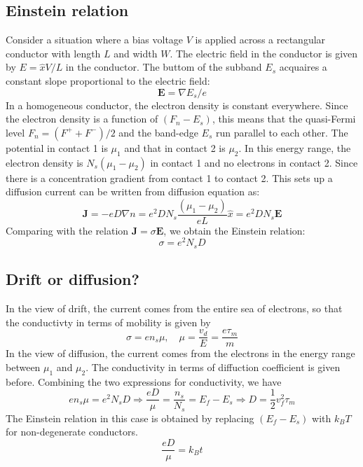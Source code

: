 \documentclass[11pt,a4paper]{book}
\theoremstyle{plain}
\theoremstyle{definition}
\theoremstyle{remark}
\renewcommand{\vec}[1]{\boldsymbol{#1}}
\begin{document}
\subsection{Einstein relation}
Consider a situation where a bias voltage $V$ is applied across a rectangular conductor with length $L$ and width $W$. The electric field in the conductor is given by $E = \hat{x}V/L$ in the conductor. The buttom of the subband $E_s$ acquaires a constant slope proportional to the electric field:
\begin{equation}
    \vec{E} = \nabla E_s/e
\end{equation}
In a homogeneous conductor, the electron density is constant everywhere. Since the electron density is a function of $(F_n-E_s)$, this means that the quasi-Fermi level $F_n = (F^+ + F^-)/2$ and the band-edge $E_s$ run parallel to each other. The potential in contact 1 is $\mu_1$ and that in contact 2 is $\mu_2$. In this energy range, the electron density is $N_s(\mu_1 - \mu_2)$ in contact 1 and no electrons in contact 2. Since there is a concentration gradient from contact 1 to contact 2. This sets up a diffusion current can be written from diffusion equation as:
\begin{equation}
    \vec{J} = -e D \nabla n = e^2 D N_s \frac{(\mu_1 - \mu_2)}{eL} \hat{x} = e^2 D N_s \vec{E}
\end{equation}
Comparing with the relation $\vec{J} = \sigma \vec{E}$, we obtain the Einstein relation:
\begin{equation}
    \sigma = e^2 N_s D
\end{equation}

\subsection{Drift or diffusion?}
In the view of drift, the current comes from the entire sea of electrons, so that the conductivty in terms of mobility is given by
\begin{equation}
    \sigma = e n_s \mu, \quad \mu = \frac{v_d}{E} = \frac{e \tau_m}{m}
\end{equation}
In the view of diffusion, the current comes from the electrons in the energy range between $\mu_1$ and $\mu_2$. The conductivity in terms of diffuction coefficient is given before. Combining the two expressions for conductivity, we have
\begin{equation}
    e n_s \mu = e^2 N_s D \Rightarrow \frac{e D}{\mu} = \frac{n_s}{N_s} = E_f - E_s \Rightarrow D = \frac{1}{2} v_f^2 \tau_m
\end{equation}
The Einstein relation in this case is obtained by replacing $(E_f-E_s)$ with $k_B T$ for non-degenerate conductors.
\begin{equation}
    \frac{e D}{\mu} = k_B t
\end{equation}
\end{document}
